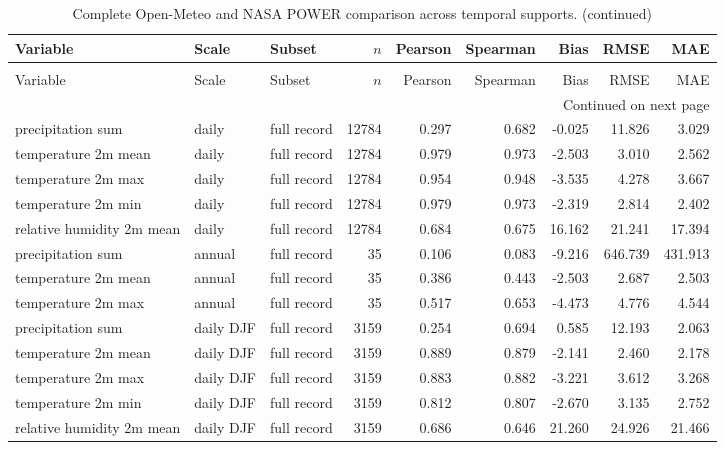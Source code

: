 \begin{landscape}
\begingroup
\tiny
\setlength{\tabcolsep}{3pt}
\begin{longtable}{p{}p{}p{}r r r r r r}
\caption{Complete Open-Meteo and NASA POWER comparison across temporal supports.}\label{tab:s-weather-comparison}\\
\toprule
Variable & Scale & Subset & $n$ & Pearson & Spearman & Bias & RMSE & MAE \\
\midrule
\endfirsthead
\caption[]{Complete Open-Meteo and NASA POWER comparison across temporal supports. (continued)}\\
\toprule
Variable & Scale & Subset & $n$ & Pearson & Spearman & Bias & RMSE & MAE \\
\midrule
\endhead
\midrule
\multicolumn{9}{r}{Continued on next page}\\
\endfoot
\bottomrule
\endlastfoot
precipitation sum & daily & full record & 12784 & 0.297 & 0.682 & -0.025 & 11.826 & 3.029 \\
temperature 2m mean & daily & full record & 12784 & 0.979 & 0.973 & -2.503 & 3.010 & 2.562 \\
temperature 2m max & daily & full record & 12784 & 0.954 & 0.948 & -3.535 & 4.278 & 3.667 \\
temperature 2m min & daily & full record & 12784 & 0.979 & 0.973 & -2.319 & 2.814 & 2.402 \\
relative humidity 2m mean & daily & full record & 12784 & 0.684 & 0.675 & 16.162 & 21.241 & 17.394 \\
precipitation sum & annual & full record & 35 & 0.106 & 0.083 & -9.216 & 646.739 & 431.913 \\
temperature 2m mean & annual & full record & 35 & 0.386 & 0.443 & -2.503 & 2.687 & 2.503 \\
temperature 2m max & annual & full record & 35 & 0.517 & 0.653 & -4.473 & 4.776 & 4.544 \\
precipitation sum & daily DJF & full record & 3159 & 0.254 & 0.694 & 0.585 & 12.193 & 2.063 \\
temperature 2m mean & daily DJF & full record & 3159 & 0.889 & 0.879 & -2.141 & 2.460 & 2.178 \\
temperature 2m max & daily DJF & full record & 3159 & 0.883 & 0.882 & -3.221 & 3.612 & 3.268 \\
temperature 2m min & daily DJF & full record & 3159 & 0.812 & 0.807 & -2.670 & 3.135 & 2.752 \\
relative humidity 2m mean & daily DJF & full record & 3159 & 0.686 & 0.646 & 21.260 & 24.926 & 21.466 \\

\end{longtable}
\end{landscape}
